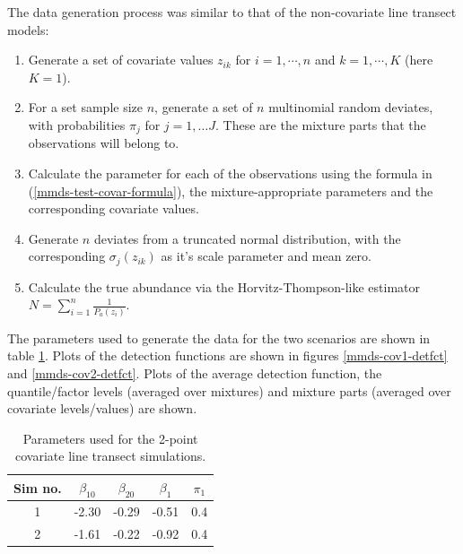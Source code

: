 The data generation process was similar to that of the non-covariate line transect models:
\begin{enumerate}
   \item Generate a set of covariate values $z_{ik}$ for $i=1,\cdots,n$ and $k=1,\cdots,K$ (here $K=1$). 
	\item For a set sample size $n$, generate a set of $n$ multinomial random deviates, with probabilities $\pi_j$ for $j=1,\ldots J$. These are the mixture parts that the observations will belong to.
   \item Calculate the parameter for each of the observations using the formula in (\ref{mmds-test-covar-formula}), the mixture-appropriate parameters and the corresponding covariate values.
	\item Generate $n$ deviates from a truncated normal distribution, with the corresponding $\sigma_j(z_{ik})$ as it's scale parameter and mean zero.
	\item Calculate the true abundance via the Horvitz-Thompson-like estimator $N=\sum_{i=1}^n \frac{1}{P_a(z_i)}$.
\end{enumerate}

The parameters used to generate the data for the two scenarios are shown in table \ref{mmds-cov-simtable}. Plots of the detection functions are shown in figures \ref{mmds-cov1-detfct} and \ref{mmds-cov2-detfct}. Plots of the average detection function, the quantile/factor levels (averaged over mixtures) and mixture parts (averaged over covariate levels/values) are shown.

\begin{table}[ht]
\centering
\begin{tabular}{c c c c c}
Sim no. & $\beta_{10}$ & $\beta_{20}$ & $\beta_1$ & $\pi_1$\\
\hline
\hline
1 & -2.30 & -0.29 & -0.51 & 0.4\\
2 & -1.61 & -0.22 & -0.92 & 0.4 \\
\end{tabular}
\label{mmds-cov-simtable}
\caption{Parameters used for the 2-point covariate line transect simulations.}
\end{table}

